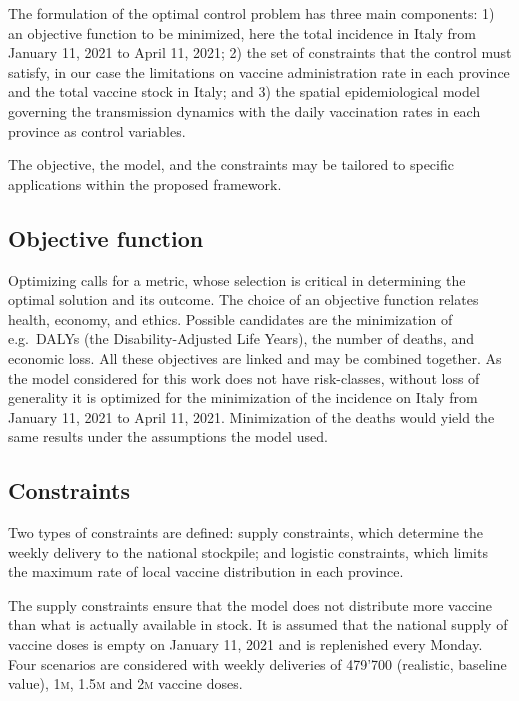 The formulation of the optimal control problem has three main components: 1) an objective function to be minimized, here the total incidence in Italy from January 11, 2021 to April 11, 2021; 2) the set of constraints that the control must satisfy, in our case the limitations on vaccine administration rate in each province and the total vaccine stock in Italy; and 3) the spatial epidemiological model\cite{Gatto:SpreadDynamicsCOVID19:2020, Bertuzzo:GeographyCOVID19Spread:2020} governing the transmission dynamics with the daily vaccination rates in each province as control variables.

The objective, the model, and the constraints may be tailored to specific applications within the proposed framework.

\subsection{Objective function}
 Optimizing calls for a metric, whose selection is critical in determining the optimal solution and its outcome. The choice of an objective function relates health, economy, and ethics. Possible candidates are the minimization of e.g.~DALYs (the Disability-Adjusted Life Years), the number of deaths, and economic loss\cite{Du:ComparativeCosteffectivenessSARSCoV2:2021}. All these objectives are linked and may be combined together. As the model considered for this work does not have risk-classes, without loss of generality it is optimized for the minimization of the incidence on Italy from January 11, 2021 to April 11, 2021. Minimization of the deaths would yield the same results under the assumptions the model used.

\subsection{Constraints} Two types of constraints are defined: supply constraints, which determine the weekly delivery to the national stockpile; and logistic constraints, which limits the maximum rate of local vaccine distribution in each province.

The supply constraints ensure that the model does not distribute more vaccine than what is actually available in stock. It is assumed that the national supply of vaccine doses is empty on January 11, 2021 and is replenished every Monday. Four scenarios are considered with weekly deliveries of 479'700 (realistic, baseline value), 1\textsc{m}, 1.5\textsc{m} and 2\textsc{m} vaccine doses.

